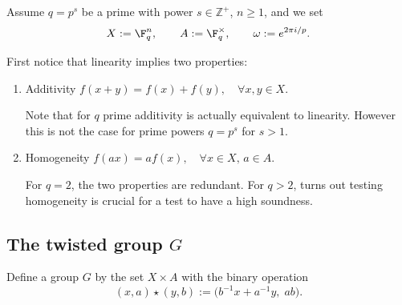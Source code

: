Assume $q = p^s$ be a prime with power $s\in \mathbb{Z}^+$, $n \ge 1$, and we set
\[
X := \F_q^n, \qquad A := \F_q^\times, \qquad \omega := e^{2\pi i/p}.
\]


First notice that linearity implies two properties: 
\begin{enumerate}
    \item Additivity $f(x + y) = f(x) + f(y), \quad \forall x, y \in X$. 
    
    Note that for $q$ prime additivity is actually equivalent to linearity. However this is not the case for prime powers $q=p^s$ for $s > 1$.
    
    \item Homogeneity $f(a x) = a f(x), \quad \forall x \in X, \, a \in A$.

    For $q=2$, the two properties are redundant. 
    For $q > 2$, turns out testing homogeneity is crucial for a test to have a high soundness.
\end{enumerate}



\subsection{The twisted group \texorpdfstring{$G$}{G}}\label{sec:group}

Define a group $G$ by the set $X \times A$ with the binary operation
\begin{equation}\label{eq:star}
(x, a) \star (y, b) := \bigl(b^{-1}x + a^{-1}y,\; ab\bigr).
\end{equation}

